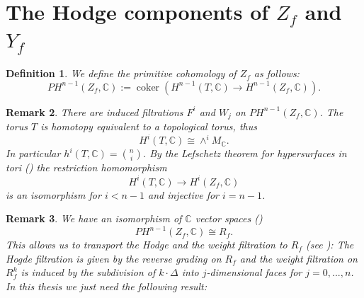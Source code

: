 \documentclass[12pt, english]{article}
\newtheorem{definition}{Definition}[section]
\newtheorem{remark}[definition]{Remark}
\DeclareMathOperator{\coker}{coker}
\begin{document}

\section{The Hodge components of $Z_f$ and $Y_f$}
\label{Section_cohomology_affine_hypersurface_nonsingular_compactification}


\begin{definition}
	We define the primitive cohomology of $Z_f$ as follows:
	\[ PH^{n-1}(Z_{f}, \mathbb{C}) := \coker(H^{n-1}(T, \mathbb{C}) \rightarrow H^{n-1}(Z_{f}, \mathbb{C})). \]
\end{definition}


\begin{remark} \label{remark_Lefschetz_theorems_hypersurfaces_in_tori}
	\normalfont
	There are induced filtrations $F^i$ and $W_j$ on $PH^{n-1}(Z_f, \mathbb{C})$. The torus $T$ is homotopy equivalent to a topological torus, thus
	\[ H^i(T, \mathbb{C}) \cong \wedge^i M_{\mathbb{C}}.  \]
	In particular $h^i(T,\mathbb{C}) = \binom{n}{i}$. By the Lefschetz theorem for hypersurfaces in tori (\cite[Remark 3.10]{DK86}) the restriction homomorphism
	\[ H^{i}(T, \mathbb{C}) \rightarrow H^{i}(Z_f, \mathbb{C})  \]
	is an isomorphism for $i < n-1$ and injective for $i=n-1$.
	
\end{remark}


\begin{remark} \label{remark_hodge_weight_filtration}
	\normalfont
	We have an isomorphism of $\mathbb{C}$ vector spaces (\cite[Thm.6.9, Cor.6.10]{Bat93})
	\[ PH^{n-1}(Z_f, \mathbb{C}) \cong R_{f}.  \]
	This allows us to transport the Hodge and the weight filtration to $R_{f}$ (see \cite[Thm.6.9, Thm.8.2]{Bat93}): The Hogde filtration is given by the reverse grading on $R_{f}$ and the weight filtration on $R_{f}^k$ is induced by the subdivision of $k \cdot \Delta$ into $j$-dimensional faces for $j=0,...,n$. In this thesis we just need the following result:
\end{remark}
\end{document}
